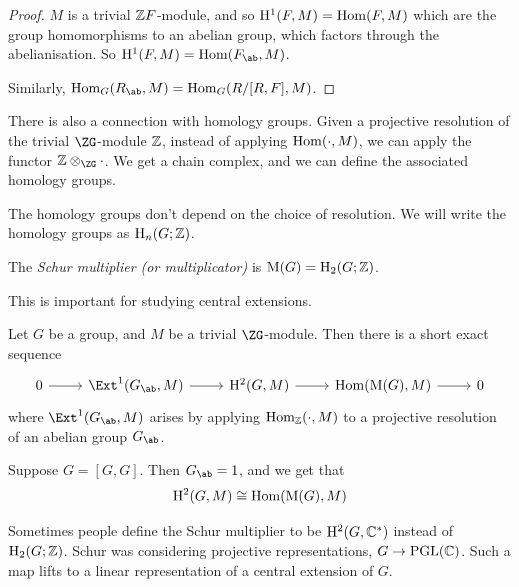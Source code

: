 \documentclass{article}
\begin{document}
\begin{proof}
    \(M\) is a trivial \(\mathbb{Z} F\)-module, and so \(\mathrm{H}^1(F, M) = \operatorname{Hom}(F, M)\) which are the group homomorphisms to an abelian group, which factors through the abelianisation. So \(\HH^1(F, M) = \Hom(F_\ab, M)\).

    Similarly, \(\Hom_G(R_\ab, M) = \Hom_G(R/[R, F], M)\).
\end{proof}

There is also a connection with homology groups. Given a projective resolution of the trivial \(\ZG\)-module \(\mathbb{Z}\), instead of applying \(\operatorname{Hom}(\cdot, M)\), we can apply the functor \(\Z \otimes_{\ZG} \cdot\). We get a chain complex, and we can define the associated homology groups.

The homology groups don't depend on the choice of resolution. We will write the homology groups as \(\mathrm{H}_n(G; \mathbb{Z})\).

\begin{definition}
     The \emph{Schur multiplier (or multiplicator)} is \(\mathrm{M}(G) = \mathrm{H}_2(G; \mathbb{Z})\).
\end{definition}

This is important for studying central extensions.

\begin{theorem}
    Let \(G\) be a group, and \(M\) be a trivial \(\ZG\)-module. Then there is a short exact sequence
\[\begin{tikzcd}
	0 & {\Ext^1(G_\ab, M)} & {\HH^2(G, M)} & {\Hom(\mathrm{M}(G), M)} & 0
	\arrow[from=1-1, to=1-2]
	\arrow[from=1-2, to=1-3]
	\arrow[from=1-3, to=1-4]
	\arrow[from=1-4, to=1-5]
\end{tikzcd}\]
    where \(\Ext^1(G_\ab, M)\) arises by applying \(\operatorname{Hom}_{\mathbb{Z}}(\cdot, M)\) to a projective resolution of an abelian group \(G_\ab\).
\end{theorem}

\begin{corollary}
    Suppose \(G = [G, G]\). Then \(G_\ab = 1\), and we get that
    \[\mathrm{H}^2(G, M) \cong \operatorname{Hom}(\mathrm{M}(G), M)\]
\end{corollary}

\begin{remark}
    Sometimes people define the Schur multiplier to be \(\mathrm{H}^2(G, \mathbb{C}^*)\) instead of \(\mathrm{H}_2(G; \mathbb{Z})\). Schur was considering projective representations, \(G \to \mathrm{PGL}(\mathbb{C})\). Such a map lifts to a linear representation of a central extension of \(G\).
\end{remark}
\end{document}
